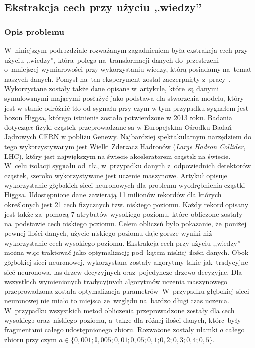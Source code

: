 \subsection{Ekstrakcja cech przy użyciu ,,wiedzy''}
\subsubsection{Opis problemu}
W~niniejszym podrozdziale rozważanym zagadnieniem była ekstrakcja cech przy użyciu ,,wiedzy'', która~polega na~transformacji danych do~przestrzeni o~mniejszej wymiarowości przy wykorzystaniu wiedzy, którą posiadamy na~temat naszych danych. Pomysł na~ten eksperyment został zaczerpnięty z~pracy~\cite{higgs1}. Wykorzystane zostały także dane opisane w~artykule, które~są danymi symulowanymi mającymi posłużyć jako podstawa dla stworzenia modelu, który jest w stanie odróżnić tło od sygnału przy czym w tym przypadku sygnałem jest bozon Higgsa, którego istnienie zostało potwierdzone w 2013 roku. 
Badania dotyczące fizyki cząstek przeprowadzane sa  w Europejskim Ośrodku Badań Jądrowych CERN w pobliżu Genewy. Najbardziej spektakularnym narzędziem do tego wykorzystywanym jest Wielki Zderzacz Hadronów (\textit{Large Hadron Collider}, LHC), który jest największym na świecie akceleratorem cząstek na świecie. W~celu izolacji sygnału od~tła, w~przypadku danych z~odpowiednich detektorów cząstek, szeroko wykorzystywane jest uczenie maszynowe. Artykuł opisuje wykorzystanie głębokich sieci neuronowych dla problemu wyodrębnienia cząstki Higgsa. Udostępnione dane zawierają 11 milionów rekordów dla których określonych jest 21 cech fizycznych tzw. niskiego poziomu. Każdy rekord opisany jest także za~pomocą 7 atrybutów wysokiego poziomu, które~obliczone zostały na~podstawie cech niskiego poziomu. Celem obliczeń było pokazanie, że~poniżej pewnej ilości danych, użycie niskiego poziomu daje gorsze wyniki niż wykorzystanie cech wysokiego poziomu. Ekstrakcja cech przy użyciu ,,wiedzy'' można więc traktować jako optymalizację pod~kątem niskiej ilości danych. Obok głębokiej sieci neuronowej, wykorzystane zostały algorytmy takie jak~tradycyjne sieć neuronowa, las drzew decyzyjnych oraz~pojedyncze drzewo decyzyjne. Dla wszystkich wymienionych tradycyjnych algorytmów uczenia maszynowego przeprowadzona została optymalizacja parametrów. W~przypadku głębokiej sieci neuronowej nie miało to miejsca ze~względu na~bardzo długi czas uczenia. W~przypadku wszystkich metod obliczenia przeprowadzone zostały dla cech wysokiego oraz~niskiego poziomu, a~także dla różnej ilości danych, które~były fragmentami całego udostępnionego zbioru. Rozważone zostały ułamki $a$ całego zbioru przy czym $a\in\{0,001; 0,005; 0,01; 0,05; 0,1; 0,2; 0,3; 0,4; 0,5\}$. 

